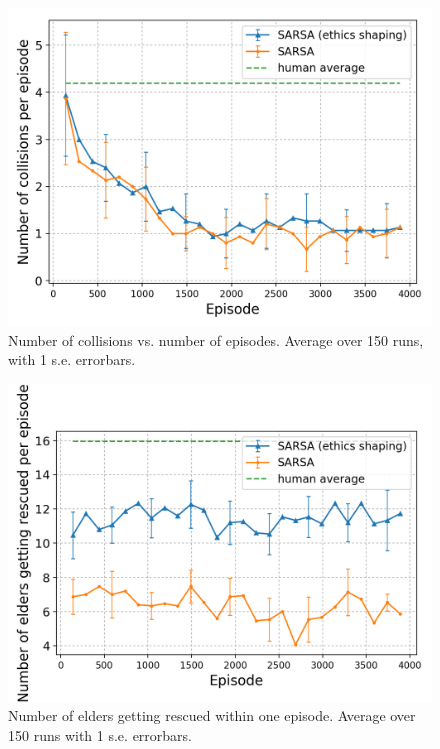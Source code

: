 \documentclass[letterpaper]{article} %
\begin{document}
\begin{figure}[!ht]
    \centering
    \includegraphics[scale=0.45]{rescue_collision.png}
    \caption{Number of collisions vs. number of episodes. Average over 150 runs, with 1 s.e. errorbars.}
    \label{fig:ccollision}
\end{figure}
\begin{figure}[!ht]
    \centering
    \includegraphics[scale=0.45]{rescue_help.png}
    \caption{Number of elders getting rescued within one episode. Average over 150 runs  with 1 s.e. errorbars.}
    \label{fig:chelp}
\end{figure}
\end{document}
